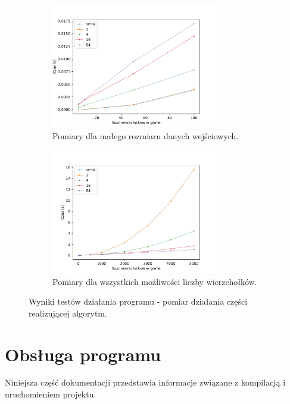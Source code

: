 \documentclass[12pt]{article}
\begin{document}
\begin{figure}[H]
\centering

\begin{subfigure}{\textwidth}
\centering
\includegraphics[width=0.8\textwidth]{static/algo_times_begin.pdf}
\caption{Pomiary dla małego rozmiaru danych wejściowych.}
\label{fig:testag1}
\end{subfigure}

\begin{subfigure}{\textwidth}
\centering
\includegraphics[width=0.8\textwidth]{static/algo_times.pdf} 
\caption{Pomiary dla wszystkich możliwości liczby wierzchołków.}
\label{fig:testag2}
\end{subfigure}

\caption{Wyniki testów działania programu - pomiar działania części realizującej algorytm.}
\label{fig:testag}
\end{figure}


\newpage
\section{Obsługa programu}
Niniejsza część dokumentacji przedstawia informacje związane z kompilacją i uruchomieniem projektu.
\end{document}
